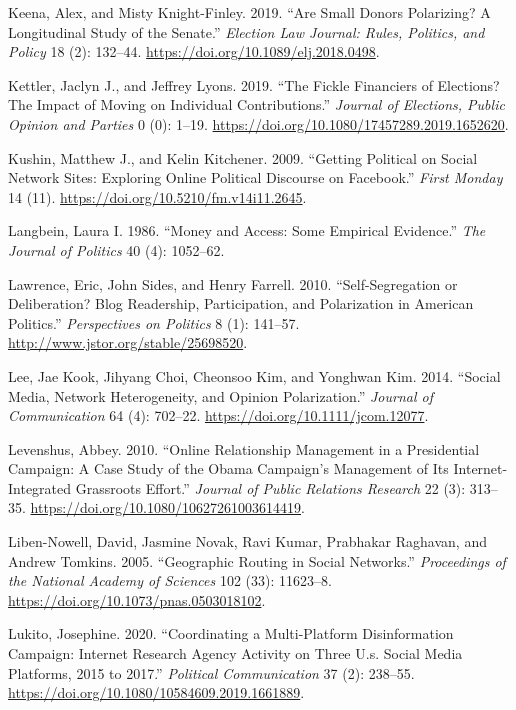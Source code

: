 \documentclass[12pt,]{article}
\begin{document}
\leavevmode\hypertarget{ref-keena2019}{}%
Keena, Alex, and Misty Knight-Finley. 2019. ``Are Small Donors
Polarizing? A Longitudinal Study of the Senate.'' \emph{Election Law
Journal: Rules, Politics, and Policy} 18 (2): 132--44.
\url{https://doi.org/10.1089/elj.2018.0498}.

\leavevmode\hypertarget{ref-kettler2019}{}%
Kettler, Jaclyn J., and Jeffrey Lyons. 2019. ``The Fickle Financiers of
Elections? The Impact of Moving on Individual Contributions.''
\emph{Journal of Elections, Public Opinion and Parties} 0 (0): 1--19.
\url{https://doi.org/10.1080/17457289.2019.1652620}.

\leavevmode\hypertarget{ref-kushin2009}{}%
Kushin, Matthew J., and Kelin Kitchener. 2009. ``Getting Political on
Social Network Sites: Exploring Online Political Discourse on
Facebook.'' \emph{First Monday} 14 (11).
\url{https://doi.org/10.5210/fm.v14i11.2645}.

\leavevmode\hypertarget{ref-langbein1986}{}%
Langbein, Laura I. 1986. ``Money and Access: Some Empirical Evidence.''
\emph{The Journal of Politics} 40 (4): 1052--62.

\leavevmode\hypertarget{ref-lawrence2010}{}%
Lawrence, Eric, John Sides, and Henry Farrell. 2010. ``Self-Segregation
or Deliberation? Blog Readership, Participation, and Polarization in
American Politics.'' \emph{Perspectives on Politics} 8 (1): 141--57.
\url{http://www.jstor.org/stable/25698520}.

\leavevmode\hypertarget{ref-lee2014}{}%
Lee, Jae Kook, Jihyang Choi, Cheonsoo Kim, and Yonghwan Kim. 2014.
``Social Media, Network Heterogeneity, and Opinion Polarization.''
\emph{Journal of Communication} 64 (4): 702--22.
\url{https://doi.org/10.1111/jcom.12077}.

\leavevmode\hypertarget{ref-levenshus2010}{}%
Levenshus, Abbey. 2010. ``Online Relationship Management in a
Presidential Campaign: A Case Study of the Obama Campaign's Management
of Its Internet-Integrated Grassroots Effort.'' \emph{Journal of Public
Relations Research} 22 (3): 313--35.
\url{https://doi.org/10.1080/10627261003614419}.

\leavevmode\hypertarget{ref-liben2005}{}%
Liben-Nowell, David, Jasmine Novak, Ravi Kumar, Prabhakar Raghavan, and
Andrew Tomkins. 2005. ``Geographic Routing in Social Networks.''
\emph{Proceedings of the National Academy of Sciences} 102 (33):
11623--8. \url{https://doi.org/10.1073/pnas.0503018102}.

\leavevmode\hypertarget{ref-lukito2020}{}%
Lukito, Josephine. 2020. ``Coordinating a Multi-Platform Disinformation
Campaign: Internet Research Agency Activity on Three U.s. Social Media
Platforms, 2015 to 2017.'' \emph{Political Communication} 37 (2):
238--55. \url{https://doi.org/10.1080/10584609.2019.1661889}.
\end{document}
